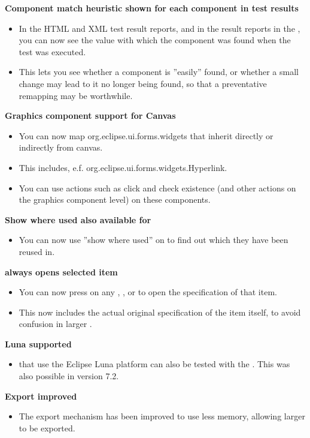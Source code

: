 \textbf{Component match heuristic shown for each component in test results}
\begin{itemize}
\item In the HTML and XML test result reports, and in the result reports in the \ite{}, you can now see the value with which the component was found when the test was executed.
\item This lets you see whether a component is ''easily'' found, or whether a small change may lead to it no longer being found, so that a preventative remapping may be worthwhile.
\end{itemize}

\textbf{Graphics component support for Canvas}
\begin{itemize}
\item You can now map org.eclipse.ui.forms.widgets that inherit directly or indirectly from canvas. 
\item This includes, e.f. org.eclipse.ui.forms.widgets.Hyperlink.
\item You can use actions such as click and check existence (and other actions on the graphics component level) on these components.
\end{itemize}

\textbf{Show where used also available for \gdsuites{}}
\begin{itemize}
\item You can now use ''show where used'' on \gdsuites{} to find out which \gdjobs{} they have been reused in.
\end{itemize}

\textbf{ always opens selected item}
\begin{itemize}
\item You can now press  on any \gdcase{}, \gdsuite{}, or \gdjob{} to open the specification of that item.
\item This now includes the actual original specification of the item itself, to avoid confusion in larger \gdprojects{}. 
\end{itemize}

\textbf{Luna \gdauts{} supported}
\begin{itemize}
\item \gdauts{} that use the Eclipse Luna platform can also be tested with the \ite{}. This was also possible in version 7.2.
\end{itemize}

\textbf{Export improved}
\begin{itemize}
\item The export mechanism has been improved to use less memory, allowing larger \gdprojects{} to be exported.
\end{itemize}

